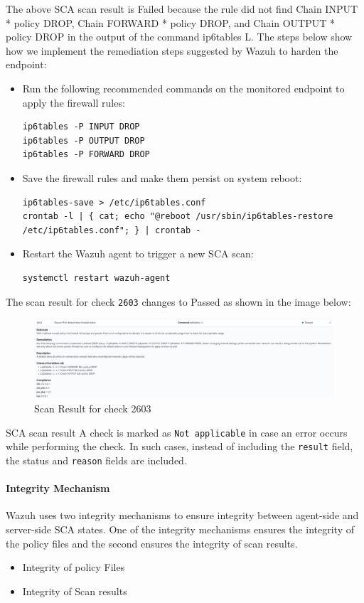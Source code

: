 The above SCA scan result is Failed because the rule did not find Chain INPUT * policy DROP, Chain FORWARD * policy DROP, and Chain OUTPUT * policy DROP in the output of the command ip6tables \-L. The steps below show how we implement the remediation steps suggested by Wazuh to harden the endpoint:

\begin{itemize}
    \item Run the following recommended commands on the monitored endpoint to apply the firewall rules:
          \begin{verbatim}
ip6tables -P INPUT DROP
ip6tables -P OUTPUT DROP
ip6tables -P FORWARD DROP
    \end{verbatim}
    \item Save the firewall rules and make them persist on system reboot:
          \begin{verbatim}
ip6tables-save > /etc/ip6tables.conf
crontab -l | { cat; echo "@reboot /usr/sbin/ip6tables-restore /etc/ip6tables.conf"; } | crontab -
    \end{verbatim}
    \item Restart the Wazuh agent to trigger a new SCA scan:
          \begin{verbatim}
systemctl restart wazuh-agent
    \end{verbatim}
\end{itemize}
The scan result for check \texttt{2603} changes to Passed as shown in the image below:

\begin{figure} [H]
    \centering
    \includegraphics[width=\textwidth]{images/sca/sca-14.png}
    \caption{Scan Result for check 2603}
    \label{fig:sca-14}
\end{figure}


SCA scan result
A check is marked as \texttt{Not applicable} in case an error occurs while performing the check. In such cases, instead of including the \texttt{result} field, the status and \texttt{reason} fields are included.

\paragraph{Integrity Mechanism}
Wazuh uses two integrity mechanisms to ensure integrity between agent-side and server-side SCA states. One of the integrity mechanisms ensures the integrity of the policy files and the second ensures the integrity of scan results.
\begin{itemize}
    \item Integrity of policy Files
    \item Integrity of Scan results
\end{itemize}


